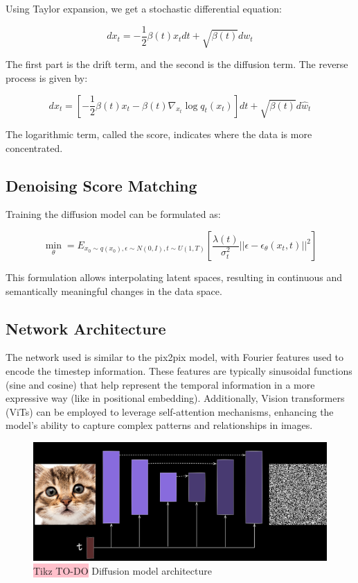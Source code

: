 Using Taylor expansion, we get a stochastic differential equation:

$$dx_t = - \frac{1}{2}\beta(t)x_t dt + \sqrt{\beta(t)}dw_t$$

The first part is the drift term, and the second is the diffusion term. The reverse process is given by:

$$dx_t = \left[-\frac{1}{2}\beta(t)x_t -\beta(t)\nabla_{x_{t}} \log q_t(x_t) \right]dt + \sqrt{\beta(t)}d\hat{w}_t$$

The logarithmic term, called the score, indicates where the data is more concentrated.

\subsection{Denoising Score Matching}

Training the diffusion model can be formulated as:

$$\min_{\theta} = E_{x_0 \sim q(x_0), \epsilon \sim N(0,I), t \sim U(1,T)} \left[ \frac{\lambda(t)}{\sigma^2_t}||\epsilon - \epsilon_{\theta}(x_t,t)||^2\right]$$

This formulation allows interpolating latent spaces, resulting in continuous and semantically meaningful changes in the data space.

\subsection{Network Architecture}

The network used is similar to the pix2pix model, with Fourier features used to encode the timestep information. These features are typically sinusoidal functions (sine and cosine) that help represent the temporal information in a more expressive way (like in positional embedding). Additionally, Vision transformers (ViTs) can be employed to leverage self-attention mechanisms, enhancing the model's ability to capture complex patterns and relationships in images.

\begin{figure}[!htbp]
    \centering
    \includegraphics[width=\linewidth]{tikz/diffusion model architecture.png}
    \caption{{\color{red}\colorbox{pink}{Tikz TO-DO}} Diffusion model architecture}
    \label{fig:enter-label}
\end{figure}

